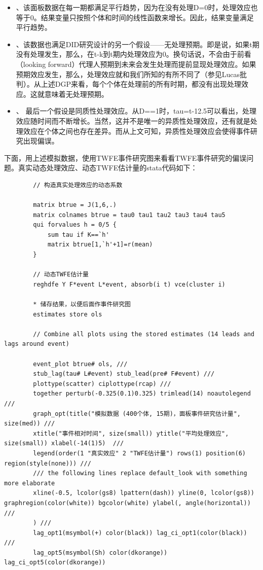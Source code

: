 \documentclass[cn,12pt,math=newtx,citestyle=gb7714-2015,bibstyle=gb7714-2015]{elegantbook}
\begin{document}
	\begin{itemize}
		\item [1]、该面板数据在每一期都满足平行趋势，因为在没有处理D=0时，处理效应也等于0。结果变量只按照个体和时间的线性函数来增长。因此，结果变量满足平行趋势。
		
		\item [2]、该数据也满足DID研究设计的另一个假设——无处理预期。即是说，如果t期没有处理发生，那么，在t-k到t期内处理效应为0。换句话说，不会由于前看（looking forward）代理人预期到未来会发生处理而提前显现处理效应。如果预期效应发生，那么，处理效应就和我们所知的有所不同了（参见Lucas批判）。从上述DGP来看，每个个体在处理前的所有时期，都没有出现处理效应。这就意味着无处理预期。
		
		\item [3]、	最后一个假设是同质性处理效应。从D==1时，tau=t-12.5可以看出，处理效应随时间而不断增长。当然，这并不是唯一的异质性处理效应，还有就是处理效应在个体之间也存在差异。而从上文可知，异质性处理效应会使得事件研究出现偏误。
	\end{itemize}
	
	下面，用上述模拟数据，使用TWFE事件研究图来看看TWFE事件研究的偏误问题。真实动态处理效应、动态TWFE估计量的stata代码如下：
	
	\begin{lstlisting}
		// 构造真实处理效应的动态系数
		
		matrix btrue = J(1,6,.)
		matrix colnames btrue = tau0 tau1 tau2 tau3 tau4 tau5
		qui forvalues h = 0/5 {
			sum tau if K==`h'
			matrix btrue[1,`h'+1]=r(mean)
		}
		
		// 动态TWFE估计量
		reghdfe Y F*event L*event, absorb(i t) vce(cluster i)
		
		* 储存结果，以便后面作事件研究图
		estimates store ols
		
		// Combine all plots using the stored estimates (14 leads and lags around event)
		
		event_plot btrue# ols, ///
		stub_lag(tau# L#event) stub_lead(pre# F#event) ///
		plottype(scatter) ciplottype(rcap) ///
		together perturb(-0.325(0.1)0.325) trimlead(14) noautolegend ///
		graph_opt(title("模拟数据 (400个体, 15期)，面板事件研究估计量", size(med)) ///
		xtitle("事件相对时间", size(small)) ytitle("平均处理效应", size(small)) xlabel(-14(1)5)  ///
		legend(order(1 "真实效应" 2 "TWFE估计量") rows(1) position(6) region(style(none))) ///
		/// the following lines replace default_look with something more elaborate
		xline(-0.5, lcolor(gs8) lpattern(dash)) yline(0, lcolor(gs8)) graphregion(color(white)) bgcolor(white) ylabel(, angle(horizontal)) ///
		) ///
		lag_opt1(msymbol(+) color(black)) lag_ci_opt1(color(black)) ///
		lag_opt5(msymbol(Sh) color(dkorange)) lag_ci_opt5(color(dkorange))
		
	\end{lstlisting}
	
\end{document}
